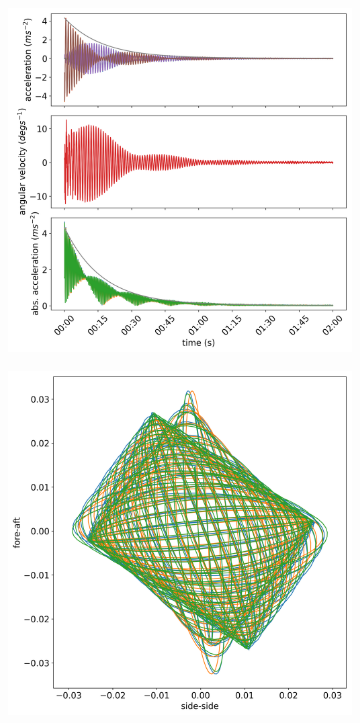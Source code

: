 \documentclass{article}
\begin{document}
\begin{figure}

    \centering
    \begin{subfigure}[b]{0.45\textwidth}
        \centering
        \includegraphics[width=\textwidth]{../results/experiment/high_mass_acceleration.png}
        \caption{}
        \label{fig:high-mass:acc}
    \end{subfigure}
    \begin{subfigure}[b]{0.45\textwidth}
        \centering
        \includegraphics[width=\textwidth]{../results/experiment/high_mass_orbit.png}

\end{subfigure}
\end{figure}
\end{document}
